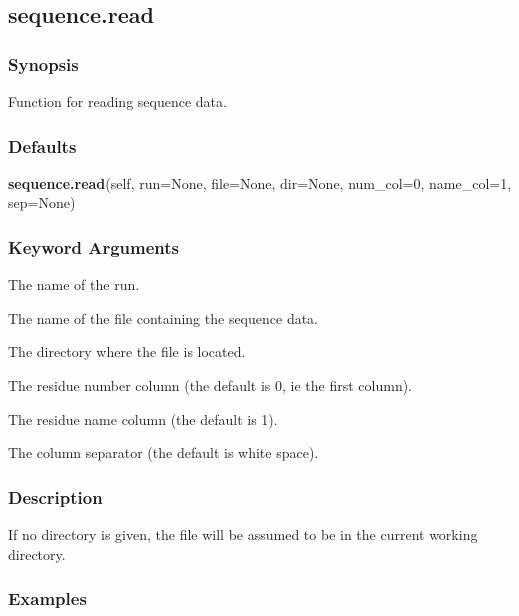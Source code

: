 \newpage

\subsection{sequence.read}


\subsubsection{Synopsis}

Function for reading sequence data.



\subsubsection{Defaults}

\textsf{\textbf{sequence.read}(self, run=None, file=None, dir=None, num\_col=0, name\_col=1, sep=None)}


\subsubsection{Keyword Arguments}

  The name of the run. 

  The name of the file containing the sequence data. 

  The directory where the file is located. 

  The residue number column (the default is 0, ie the first column). 

  The residue name column (the default is 1). 

  The column separator (the default is white space). 




\subsubsection{Description}

If no directory is given, the file will be assumed to be in the current working directory.



\subsubsection{Examples}

